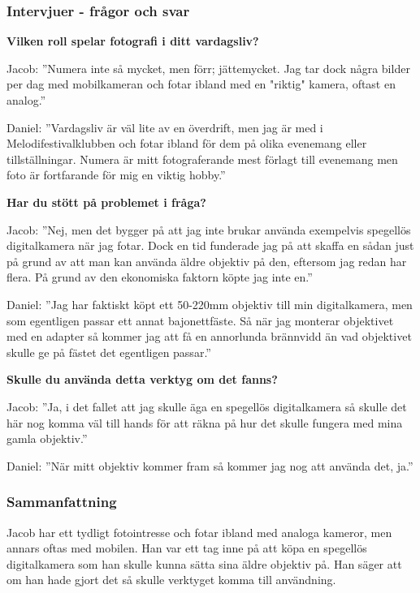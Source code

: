 \documentclass[11pt]{article}
\begin{document}
\subsubsection{Intervjuer - frågor och svar}
\textbf{Vilken roll spelar fotografi i ditt vardagsliv?}\par

Jacob: ”Numera inte så mycket, men förr; jättemycket. Jag tar dock några bilder
per dag med mobilkameran och fotar ibland med en "riktig" kamera, oftast en
analog.”\par

Daniel: ”Vardagsliv är väl lite av en överdrift, men jag är med i
Melodifestivalklubben och fotar ibland för dem på olika evenemang eller
tillställningar. Numera är mitt fotograferande mest förlagt till evenemang men
foto är fortfarande för mig en viktig hobby.”\par

\textbf{Har du stött på problemet i fråga?}\par

Jacob: ”Nej, men det bygger på att jag inte brukar använda exempelvis spegellös
digitalkamera när jag fotar. Dock en tid funderade jag på att skaffa en sådan
just på grund av att man kan använda äldre objektiv på den, eftersom jag redan
har flera. På grund av den ekonomiska faktorn köpte jag inte en.”\par

\sloppy
Daniel: ”Jag har faktiskt köpt ett 50-220mm objektiv till min digitalkamera, men
som egentligen passar ett annat bajonettfäste. Så när jag monterar objektivet
med en adapter så kommer jag att få en annorlunda brännvidd än vad objektivet
skulle ge på fästet det egentligen passar.”\par
\fussy

\textbf{Skulle du använda detta verktyg om det fanns?}\par

Jacob: ”Ja, i det fallet att jag skulle äga en spegellös digitalkamera så
skulle det här nog komma väl till hands för att räkna på hur det skulle fungera
med mina gamla objektiv.”\par

Daniel: ”När mitt objektiv kommer fram så kommer jag nog att använda det, ja.”
\par


\subsubsection{Sammanfattning}
\sloppy
Jacob har ett tydligt fotointresse och fotar ibland med analoga kameror, men
annars oftas med mobilen. Han var ett tag inne på att köpa en spegellös
digitalkamera som han skulle kunna sätta sina äldre objektiv på. Han säger att
om han hade gjort det så skulle verktyget komma till användning.\par
\end{document}
